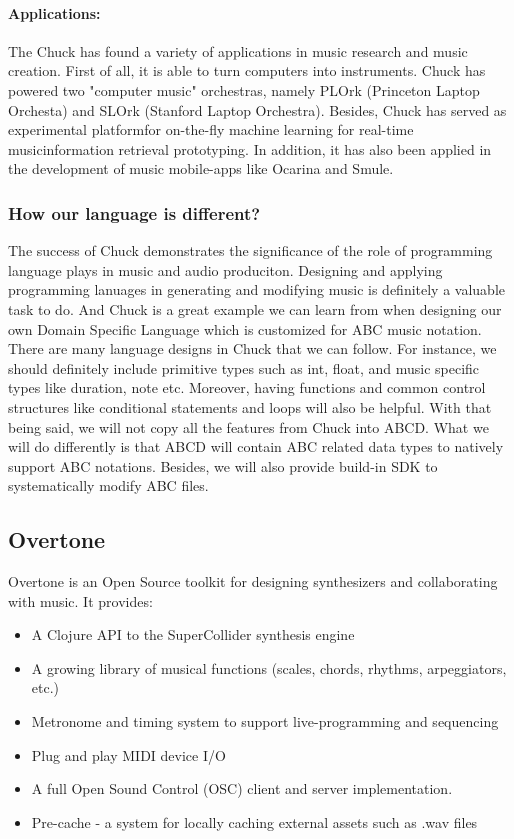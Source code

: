 		\paragraph{Applications:}
			The Chuck has found a variety of applications in music research and music creation. First of all, it is able to turn computers into instruments. Chuck has powered two "computer music" orchestras, namely PLOrk (Princeton Laptop Orchesta) and SLOrk (Stanford Laptop Orchestra). Besides, Chuck has served as experimental platformfor on-the-fly machine learning for real-time musicinformation retrieval prototyping\cite{Wang15}. In addition, it has also been applied in the development of music mobile-apps like Ocarina and Smule\cite{Wang15}.
	\subsubsection{How our language is different?}
	
		The success of Chuck demonstrates the significance of the role of programming language plays in music and audio produciton. Designing and applying programming lanuages in generating and modifying music is definitely a valuable task to do. And Chuck is a great example we can learn from when designing our own Domain Specific Language which is customized for ABC music notation. There are many language designs in Chuck that we can follow. For instance, we should definitely include primitive types such as int, float, and music specific types like duration, note etc. Moreover, having functions and common control structures like conditional statements and loops will also be helpful. With that being said, we will not copy all the features from Chuck into ABCD. What we will do differently is that ABCD will contain ABC related data types to natively support ABC notations. Besides, we will also provide build-in SDK to systematically modify ABC files. 

\subsection{Overtone}

Overtone is an Open Source toolkit for designing synthesizers and collaborating with music. It provides\cite{Aaron16}:
\begin{itemize}
\item A Clojure API to the SuperCollider synthesis engine
\item A growing library of musical functions (scales, chords, rhythms, arpeggiators, etc.)
\item Metronome and timing system to support live-programming and sequencing
\item Plug and play MIDI device I/O
\item A full Open Sound Control (OSC) client and server implementation.
\item Pre-cache - a system for locally caching external assets such as .wav files
\end{itemize}

